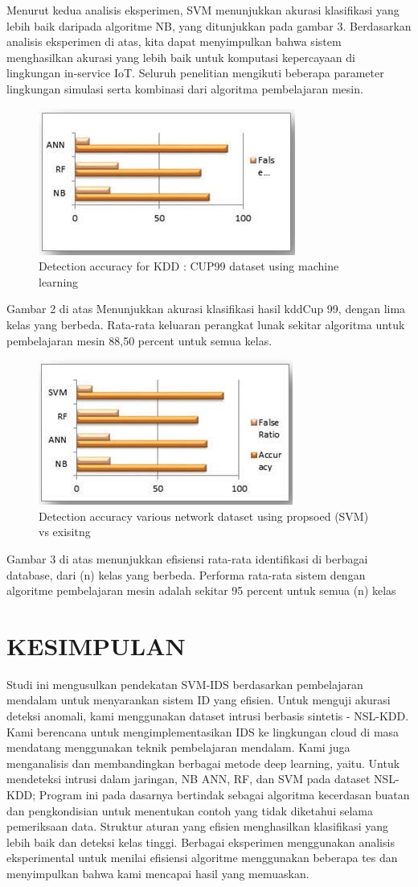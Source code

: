 \documentclass[conference]{IEEEtran}
\begin{document}
Menurut kedua analisis eksperimen, SVM menunjukkan akurasi klasifikasi yang lebih baik daripada algoritme NB, yang ditunjukkan pada gambar 3. Berdasarkan analisis eksperimen di atas, kita dapat menyimpulkan bahwa sistem menghasilkan akurasi yang lebih baik untuk komputasi kepercayaan di lingkungan in-service IoT. Seluruh penelitian mengikuti beberapa parameter lingkungan simulasi serta kombinasi dari algoritma pembelajaran mesin.

\begin{figure}
\centering
\includegraphics[width=.3\textwidth]{Gambar/pct2.jpg}
\caption{Detection accuracy for KDD : CUP99 dataset using machine learning}
\end{figure}

Gambar 2 di atas Menunjukkan akurasi klasifikasi hasil kddCup 99, dengan lima kelas yang berbeda. Rata-rata keluaran perangkat lunak sekitar algoritma untuk pembelajaran mesin 88,50 percent untuk semua kelas.

\begin{figure}
\centering
\includegraphics[width=.3\textwidth]{Gambar/pct3.jpg}
\caption{Detection accuracy various network dataset using propsoed (SVM) vs exisitng}
\end{figure}

Gambar 3 di atas menunjukkan efisiensi rata-rata identifikasi di berbagai database, dari (n) kelas yang berbeda. Performa rata-rata sistem dengan algoritme pembelajaran mesin adalah sekitar 95 percent untuk semua (n) kelas

\section{KESIMPULAN}

Studi ini mengusulkan pendekatan SVM-IDS berdasarkan pembelajaran mendalam untuk menyarankan sistem ID yang efisien. Untuk menguji akurasi deteksi anomali, kami menggunakan dataset intrusi berbasis sintetis - NSL-KDD. Kami berencana untuk mengimplementasikan IDS ke lingkungan cloud di masa mendatang menggunakan teknik pembelajaran mendalam. Kami juga menganalisis dan membandingkan berbagai metode deep learning, yaitu. Untuk mendeteksi intrusi dalam jaringan, NB ANN, RF, dan SVM pada dataset NSL-KDD; Program ini pada dasarnya bertindak sebagai algoritma kecerdasan buatan dan pengkondisian untuk menentukan contoh yang tidak diketahui selama pemeriksaan data. Struktur aturan yang efisien menghasilkan klasifikasi yang lebih baik dan deteksi kelas tinggi. Berbagai eksperimen menggunakan analisis eksperimental untuk menilai efisiensi algoritme menggunakan beberapa tes dan menyimpulkan bahwa kami mencapai hasil yang memuaskan.




\end{document}
